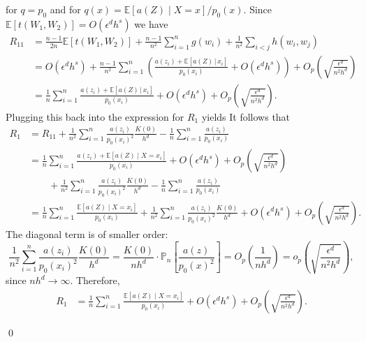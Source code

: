 \documentclass[11pt]{article}
\begin{document}
for $q=p_0$ and for $q(x)=\mathbb{E}[a(Z)\mid X=x]/p_0(x)$. Since $\mathbb{E}[t(W_1, W_2)] = O(\epsilon^dh^s)$ we have
\begin{align*}
    R_{11} &= \frac{n-1}{2n}\mathbb{E}[t(W_1, W_2)] + \frac{n-1}{n^2}\sum_{i = 1}^n g(w_i) + \frac{1}{n^2}\sum_{i < j}h(w_i, w_j) \\
    &= O(\epsilon^d h^s) + \frac{n-1}{n^2} \sum_{i = 1}^n \left(\frac{a(z_i) + \mathbb{E}[a(Z)\,| \,x_i]}{p_0(x_i)} + O(\epsilon^dh^s)\right) + O_p\left( \sqrt{\frac{\epsilon^d}{n^2h^d}}\right) \\
    &= \frac{1}{n}\sum_{i = 1}^n \frac{a(z_i) + \mathbb{E}[a(Z)\,| \,x_i]}{p_0(x_i)} + O(\epsilon^dh^s) + O_p\left( \sqrt{\frac{\epsilon^d}{n^2h^d}}\right).
\end{align*}
Plugging this back into the expression for $R_1$ yields
It follows that
\begin{align*}
    R_1
    &= R_{11} + \frac{1}{n^2}\sum_{i = 1}^n \frac{a(z_i)}{p_0(x_i)^2}\frac{K(0)}{h^d}
    - \frac{1}{n}\sum_{i = 1}^n \frac{a(z_i)}{p_0(x_i)} \\
    &= \frac{1}{n}\sum_{i = 1}^n \frac{a(z_i) + \mathbb{E}[a(Z)\mid X = x_i]}{p_0(x_i)}
    + O(\epsilon^d h^s) + O_p\left(\sqrt{\frac{\epsilon^d}{n^2 h^d}}\right) \\
    &\qquad + \frac{1}{n^2}\sum_{i = 1}^n \frac{a(z_i)}{p_0(x_i)^2}\frac{K(0)}{h^d}
    - \frac{1}{n}\sum_{i = 1}^n \frac{a(z_i)}{p_0(x_i)} \\
    &= \frac{1}{n}\sum_{i = 1}^n \frac{\mathbb{E}[a(Z)\mid X = x_i]}{p_0(x_i)}
    + \frac{1}{n^2}\sum_{i = 1}^n \frac{a(z_i)}{p_0(x_i)^2}\frac{K(0)}{h^d}
    + O(\epsilon^d h^s) + O_p\left(\sqrt{\frac{\epsilon^d}{n^2 h^d}}\right).
\end{align*}
The diagonal term is of smaller order:
\[
\frac{1}{n^2}\sum_{i = 1}^n \frac{a(z_i)}{p_0(x_i)^2}\frac{K(0)}{h^d}
=
\frac{K(0)}{n h^d} \cdot \mathbb{P}_n\left[\frac{a(z)}{p_0(x)^2}\right]
=
O_p\left(\frac{1}{n h^d}\right)
=
o_p\left(\sqrt{\frac{\epsilon^d}{n^2 h^d}}\right),
\]
since \(n h^d \to \infty\). Therefore,
\begin{align*}
    R_1
    &= \frac{1}{n}\sum_{i = 1}^n \frac{\mathbb{E}[a(Z)\mid X = x_i]}{p_0(x_i)}
    + O(\epsilon^d h^s) + O_p\left(\sqrt{\frac{\epsilon^d}{n^2 h^d}}\right).
\end{align*}

\qed{}
\end{document}
